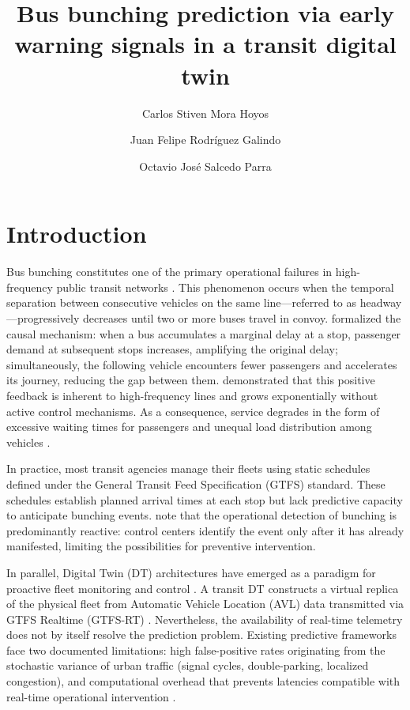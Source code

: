 \documentclass[fleqn,10pt,lineno]{wlpeerj}
\title{Bus bunching prediction via early warning signals in a transit digital twin}
\author[1]{Carlos Stiven Mora Hoyos}
\author[1]{Juan Felipe Rodr\'iguez Galindo}
\author[1]{Octavio Jos\'e Salcedo Parra}
\affil[1]{Facultad de Ingenier\'ia, Maestr\'ia en Ciencias de la Informaci\'on y las Comunicaciones, Universidad Distrital Francisco Jos\'e de Caldas, Bogot\'a, Colombia}
\begin{document}
\flushbottom
\maketitle
\thispagestyle{empty}

\section{Introduction}

Bus bunching constitutes one of the primary operational failures in high-frequency public
transit networks \citep{1,21}. This phenomenon occurs when the temporal separation between
consecutive vehicles on the same line---referred to as headway---progressively decreases until
two or more buses travel in convoy. \citet{1} formalized the causal mechanism: when a bus
accumulates a marginal delay at a stop, passenger demand at subsequent stops increases,
amplifying the original delay; simultaneously, the following vehicle encounters fewer passengers
and accelerates its journey, reducing the gap between them. \citet{2} demonstrated that this
positive feedback is inherent to high-frequency lines and grows exponentially without active
control mechanisms. As a consequence, service degrades in the form of excessive waiting times
for passengers and unequal load distribution among vehicles \citep{3}.

In practice, most transit agencies manage their fleets using static schedules defined under the
General Transit Feed Specification (GTFS) standard. These schedules establish planned arrival
times at each stop but lack predictive capacity to anticipate bunching events.
\citet{21} note that the operational detection of bunching is predominantly reactive: control
centers identify the event only after it has already manifested, limiting the possibilities for
preventive intervention.

In parallel, Digital Twin (DT) architectures have emerged as a paradigm for proactive fleet
monitoring and control \citep{5,6}. A transit DT constructs a virtual replica of the physical
fleet from Automatic Vehicle Location (AVL) data transmitted via GTFS Realtime (GTFS-RT)
\citep{7}. Nevertheless, the availability of real-time telemetry does not by itself resolve the
prediction problem. Existing predictive frameworks face two documented limitations: high
false-positive rates originating from the stochastic variance of urban traffic (signal cycles,
double-parking, localized congestion), and computational overhead that prevents latencies
compatible with real-time operational intervention \citep{8,9}.
\end{document}
